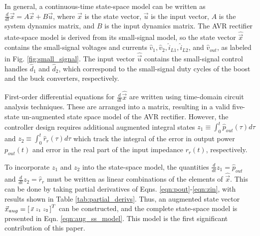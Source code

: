 \documentclass[conference, twocolumn, letterpaper]{IEEEtran}
\begin{document}
In general, a continuous-time state-space model can be written as $\frac{d}{dt}\vec{x} = A\vec{x} + B\vec{u}$, where $\vec{x}$ is the state vector, $\vec{u}$ is the input vector, $A$ is the system dynamics matrix, and $B$ is the input dynamics matrix. The AVR rectifier state-space model is derived from its small-signal model, so the state vector $\hat{\vec{x}}$ contains the small-signal voltages and currents $\hat{v}_1, \hat{v}_2, \hat{i}_{L1}, \hat{i}_{L2}$, and $\hat{v}_{out}$, as labeled in Fig. \ref{fig:small_signal}. The input vector $\hat{\vec{u}}$ contains the small-signal control handles $\hat{d}_1$ and $\hat{d}_2$, which correspond to the small-signal duty cycles of the boost and the buck converters, respectively.

First-order differential equations for $\frac{d}{dt}\hat{\vec{x}}$ are written using time-domain circuit analysis techniques. These are arranged into a matrix, resulting in a valid five-state un-augmented state space model of the AVR rectifier. However, the controller design requires additional augmented integral states $z_1 \equiv \int_0^t \hat{p}_{out}(\tau) d\tau$ and $z_2 \equiv \int_0^t \hat{r}_r(\tau) d\tau$ which track the integral of the error in output power $p_{out}(t)$ and error in the real part of the input impedance $r_r(t)$, respectively. 

To incorporate $z_1$ and $z_2$ into the state-space model, the quantities $\frac{d}{dt}z_1 = \hat{p}_{out}$ and $\frac{d}{dt}z_2 = \hat{r}_r$ must be written as linear combinations of the elements of $\hat{\vec{x}}$. This can be done by taking partial derivatives of Eqns. \ref{eqn:pout}-\ref{eqn:zin}, with results shown in Table \ref{tab:partial_derivs}. Thus, an augmented state vector $\vec{x}_{aug} = \begin{bsmallmatrix} \vec{x} & z_1 & z_2 \end{bsmallmatrix}^T$ can be constructed, and the complete state-space model is presented in Eqn. \ref{eqn:aug_ss_model}. This model is the first significant contribution of this paper.
\end{document}
